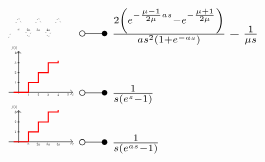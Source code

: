 \begin{footnotesize}
\[\begin{array}{@{}l@{ ~ \laplace ~ }l@{}}
\begin{tikzpicture}[domain=0:5, scale=\graphtabscale, every node/.style={scale=\graphtabscale}]
    \draw (1,0) node[below] {$a$};
    \draw (2,0) node[below] {$2a$};
    \draw (3,0) node[below] {$3a$};
    \draw (4,0) node[below] {$4a$};
    \draw[dotted] (0.75,0.5) -- (1,1) -- (1.25,0.5);
    \draw[dotted] (2.75,0.5) -- (3,1) -- (3.25,0.5);
    \draw[dotted] (4.75,0.5) -- (5,1) -- (5.25,0.5);
    \draw[dotted] (0,-1) -- (0.25,-0.5);
    \draw[dotted] (1.75,-0.5) -- (2,-1) -- (2.25,-0.5);
    \draw[dotted] (3.75,-0.5) -- (4,-1) -- (4.25,-0.5);
\end{tikzpicture} &
    \frac{2 \left(e^{-\frac{\mu - 1}{2 \mu}as} - e^{-\frac{\mu + 1}{2\mu}}\right)}{as^2 (1 + e^{-as})} - \frac{1}{\mu s} \\
\begin{tikzpicture}[domain=0:5, scale=\graphtabscale, every node/.style={scale=\graphtabscale}]
    \draw[->] (-1,0) -- (5.5,0) node[below] {$t$};
    \draw[->] (0,-0.1) -- (0,4.2) node[above left] {$f(t)$};
    \draw[-] (-0.1,1) node[left] {$1$} -- (0.1,1);
    \draw[-] (-0.1,2) node[left] {$2$} -- (0.1,2);
    \draw[-] (-0.1,3) node[left] {$3$} -- (0.1,3);
    \draw[-] (-0.1,4) node[left] {$4$} -- (0.1,4);
    \draw[thick, red]
        (-0.5,0)
        --
        (1,0)
        --
        (1,1)
        --
        (2,1)
        --
        (2,2)
        --
        (3,2)
        --
        (3,3)
        --
        (4,3)
        --
        (4,3.2);
    \draw (1,0) node[below] {$1$};
    \draw (2,0) node[below] {$2$};
    \draw (3,0) node[below] {$3$};
    \draw (4,0) node[below] {$4$};
    \draw (5,0) node[below] {$5$};
\end{tikzpicture} &
    \frac{1}{s (e^s - 1)} \\
\begin{tikzpicture}[domain=0:5, scale=\graphtabscale, every node/.style={scale=\graphtabscale}]
    \draw[->] (-1,0) -- (5.5,0) node[below] {$t$};
    \draw[->] (0,-0.1) -- (0,3.2) node[above left] {$f(t)$};
    \draw[-] (-0.1,1) node[left] {$1$} -- (0.1,1);
    \draw[-] (-0.1,2) node[left] {$2$} -- (0.1,2);
    \draw[-] (-0.1,3) node[left] {$3$} -- (0.1,3);
    \draw[thick, red]
        (-0.5,0)
        --
        (1,0)
        --
        (1,1)
        --
        (2,1)
        --
        (2,2)
        --
        (3,2)
        --
        (3,3)
        --
        (4,3)
        --
        (4,3.2);
    \draw (1,0) node[below] {$a$};
    \draw (2,0) node[below] {$2a$};
    \draw (3,0) node[below] {$3a$};
    \draw (4,0) node[below] {$4a$};
\end{tikzpicture} &
    \frac{1}{s (e^{as} - 1)} \\

\end{array}\]
\end{footnotesize}
